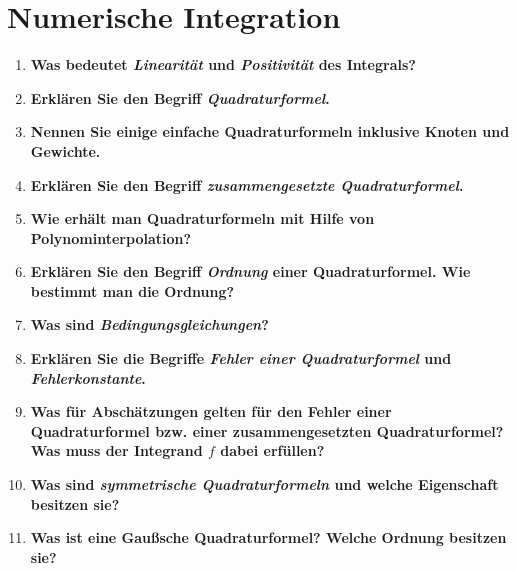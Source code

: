 \documentclass[10pt,a4paper]{article}
\begin{document}
	\section{Numerische Integration}
	\begin{enumerate}
		\item \textbf{Was bedeutet \textit{Linearität} und \textit{Positivität} des Integrals?} \\
		
		\item \textbf{Erklären Sie den Begriff \textit{Quadraturformel}.} \\
		
		\item \textbf{Nennen Sie einige einfache Quadraturformeln inklusive Knoten und Gewichte.} \\
		
		\item \textbf{Erklären Sie den Begriff \textit{zusammengesetzte Quadraturformel}.} \\
		
		\item \textbf{Wie erhält man Quadraturformeln mit Hilfe von Polynominterpolation?} \\
		
		\item \textbf{Erklären Sie den Begriff \textit{Ordnung} einer Quadraturformel. Wie bestimmt man die Ordnung?} \\
		
		\item \textbf{Was sind \textit{Bedingungsgleichungen}?} \\
		
		\item \textbf{Erklären Sie die Begriffe \textit{Fehler einer Quadraturformel} und \textit{Fehlerkonstante}.} \\
		
		\item \textbf{Was für Abschätzungen gelten für den Fehler einer Quadraturformel bzw. einer zusammengesetzten Quadraturformel? Was muss der Integrand $f$ dabei erfüllen?} \\
		
		\item \textbf{Was sind \textit{symmetrische Quadraturformeln} und welche Eigenschaft besitzen sie?} \\
		
		\item \textbf{Was ist eine Gaußsche Quadraturformel? Welche Ordnung besitzen sie?} \\
		

\end{enumerate}
\end{document}
